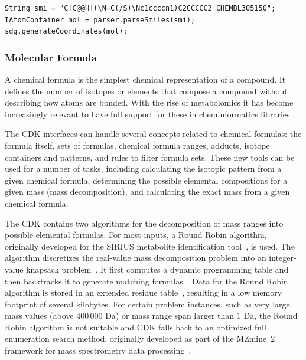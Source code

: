 \documentclass[10pt]{bmcart}
\begin{document}
\vspace{0.2cm}
\begin{verbatim}
String smi = "C[C@@H](\N=C(/S)\Nc1ccccn1)C2CCCCC2 CHEMBL305150";
IAtomContainer mol = parser.parseSmiles(smi);
sdg.generateCoordinates(mol);
\end{verbatim}
\vspace{0.2cm}

 \subsubsection*{Molecular Formula}

A chemical formula is the simplest chemical representation of a
compound.  It defines the number of isotopes or elements that
compose  a compound without describing how atoms
are bonded. With the rise of metabolomics it has become increasingly
relevant to have full support for these in cheminformatics
libraries~\cite{Wolf2010,RojasCherto2011,Pluskal2012,Pluskal2010,Duhrkop2015}.

The CDK interfaces can handle several concepts related to chemical formulas:
the formula itself, sets of formulas, chemical formula ranges, adducts, isotope
containers and patterns, and rules to filter formula sets. These new tools can
be used for a number of tasks, including calculating the isotopic pattern from
a given chemical formula, determining the possible elemental compositions for a
given mass (mass decomposition), and calculating the exact mass from a given
chemical formula.

The CDK contains two algorithms for the decomposition of mass ranges into
possible elemental formulas. For most inputs, a Round Robin algorithm,
originally developed for the SIRIUS metabolite identification
tool~\cite{Bocker2009}, is used. The algorithm discretizes the real-value mass
decomposition problem into an integer-value knapsack
problem~\cite{Martello1990}. It first computes a dynamic programming table and
then backtracks it to generate matching formulas~\cite{Duehrkop2013,
Boecker2008}. Data for the Round Robin algorithm is stored in an extended
residue table~\cite{Bocker2005}, resulting in a low memory footprint of several
kilobytes. For certain problem instances, such as very large mass values (above
$400\,000$ Da) or mass range span larger than $1$ Da, the Round Robin algorithm
is not suitable and CDK falls back to an optimized full enumeration search
method, originally developed as part of the MZmine~2 framework for mass
spectrometry data processing~\cite{Pluskal2012, Pluskal2010}.
\end{document}
